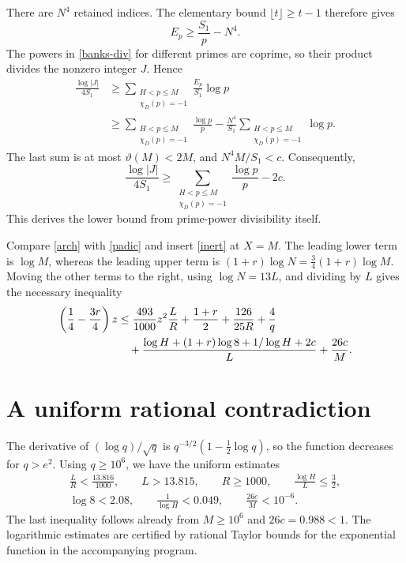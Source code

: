 \documentclass[11pt]{article}
\begin{document}
There are \(N^4\) retained indices. The elementary bound
\(\lfloor t\rfloor\ge t-1\) therefore gives
\[
 E_p\ge\frac{S_1}{p}-N^4.
\]
The powers in \eqref{banks-div} for different primes are coprime, so
their product divides the nonzero integer \(J\). Hence
\begin{align*}
 \frac{\log|J|}{4S_1}
 &\ge\sum_{\substack{H<p\le M\\\chi_D(p)=-1}}
                       \frac{E_p}{S_1}\log p\\
 &\ge\sum_{\substack{H<p\le M\\\chi_D(p)=-1}}\frac{\log p}{p}
       -\frac{N^4}{S_1}
        \sum_{\substack{H<p\le M\\\chi_D(p)=-1}}\log p.
\end{align*}
The last sum is at most \(\vartheta(M)<2M\), and
\(N^4M/S_1<c\). Consequently,
\begin{equation}\label{padic}
 \frac{\log|J|}{4S_1}
 \ge\sum_{\substack{H<p\le M\\\chi_D(p)=-1}}\frac{\log p}{p}-2c.
\end{equation}
This derives the lower bound from prime-power divisibility itself.

Compare \eqref{arch} with \eqref{padic} and insert \eqref{inert}
at \(X=M\). The leading lower term is \(\log M\), whereas the leading
upper term is \((1+r)\log N=\tfrac34(1+r)\log M\).
Moving the other terms to the right, using \(\log N=13L\), and
dividing by \(L\) gives the necessary inequality
\begin{align}
 \left(\frac14-\frac{3r}{4}\right)z
 &\le \frac{493}{1000}z^2\frac{L}{R}
       +\frac{1+r}{2}+\frac{126}{25R}+\frac4q \notag\\
 &\quad+\frac{\log H+(1+r)\log8+1/\log H+2c}{L}
       +\frac{26c}{M}.\label{necessary}
\end{align}

\section{A uniform rational contradiction}\label{contradiction}

The derivative of \((\log q)/\sqrt q\) is
\(q^{-3/2}(1-\tfrac12\log q)\), so the function decreases for \(q>e^2\).
Using \(q\ge10^6\), we have the uniform estimates
\[
 \begin{gathered}
 \frac LR<\frac{13.816}{1000},\qquad L>13.815,\qquad R\ge1000,\qquad
 \frac{\log H}{L}\le\frac32,\\
 \log8<2.08,\qquad \frac1{\log H}<0.049,\qquad
 \frac{26c}{M}<10^{-6}.
 \end{gathered}
\]
The last inequality follows already from \(M\ge10^6\) and
\(26c=0.988<1\). The logarithmic estimates are certified by rational
Taylor bounds for the exponential function in the accompanying program.
\end{document}
